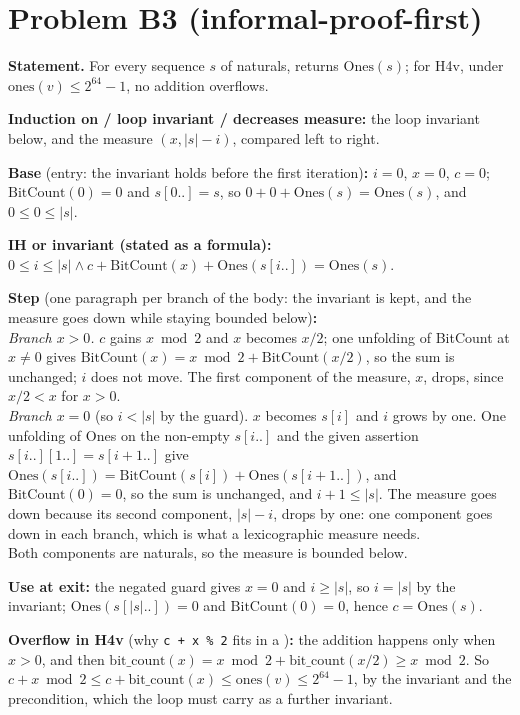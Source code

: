 \documentclass[11pt]{article}
\begin{document}
\section*{Problem B3 (informal-proof-first)}\label{ans:B3}
\begin{answer}
\textbf{Statement.} For every sequence $s$ of naturals, 
returns $\mathrm{Ones}(s)$; for H4v, under $\mathrm{ones}(v) \leq 2^{64} - 1$,
no addition overflows.

\textbf{Induction on / loop invariant / decreases measure:} the loop
invariant below, and the measure $(x, |s| - i)$, compared left to right.

\textbf{Base} (entry: the invariant holds before the first iteration)\textbf{:}
$i = 0$, $x = 0$, $c = 0$; $\mathrm{BitCount}(0) = 0$ and $s[0..] = s$, so
$0 + 0 + \mathrm{Ones}(s) = \mathrm{Ones}(s)$, and $0 \leq 0 \leq |s|$.

\textbf{IH or invariant (stated as a formula):}
$0 \leq i \leq |s| \wedge c + \mathrm{BitCount}(x) + \mathrm{Ones}(s[i..]) =
\mathrm{Ones}(s)$.

\textbf{Step} (one paragraph per branch of the body: the invariant is kept,
and the measure goes down while staying bounded below)\textbf{:} \\
\emph{Branch $x > 0$.} $c$ gains $x \bmod 2$ and $x$ becomes $x / 2$; one
unfolding of BitCount at $x \neq 0$ gives $\mathrm{BitCount}(x) = x \bmod 2 +
\mathrm{BitCount}(x / 2)$, so the sum is unchanged; $i$ does not move. The
first component of the measure, $x$, drops, since $x / 2 < x$ for $x > 0$. \\
\emph{Branch $x = 0$} (so $i < |s|$ by the guard). $x$ becomes $s[i]$ and $i$
grows by one. One unfolding of Ones on the non-empty $s[i..]$ and the given
assertion $s[i..][1..] = s[i + 1..]$ give $\mathrm{Ones}(s[i..]) =
\mathrm{BitCount}(s[i]) + \mathrm{Ones}(s[i + 1..])$, and $\mathrm{BitCount}(0)
= 0$, so the sum is unchanged, and $i + 1 \leq |s|$. The measure goes down
because its second component, $|s| - i$, drops by one: one component goes
down in each branch, which is what a lexicographic measure needs. \\
Both components are naturals, so the measure is bounded below.

\textbf{Use at exit:} the negated guard gives $x = 0$ and $i \geq |s|$, so
$i = |s|$ by the invariant; $\mathrm{Ones}(s[|s|..]) = 0$ and
$\mathrm{BitCount}(0) = 0$, hence $c = \mathrm{Ones}(s)$.

\textbf{Overflow in H4v} (why \texttt{c + x \% 2} fits in a )\textbf{:}
the addition happens only when $x > 0$, and then $\mathrm{bit\_count}(x) = x
\bmod 2 + \mathrm{bit\_count}(x / 2) \geq x \bmod 2$. So $c + x \bmod 2 \leq c +
\mathrm{bit\_count}(x) \leq \mathrm{ones}(v) \leq 2^{64} - 1$, by the
invariant and the precondition, which the loop must carry as a further
invariant.


\end{answer}
\end{document}
